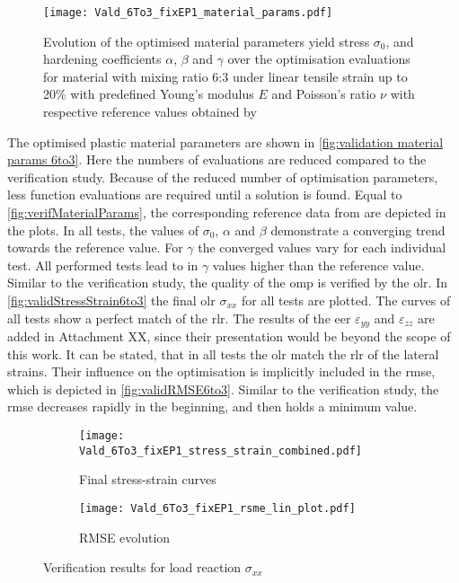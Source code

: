 \begin{figure}[H]
    \centering
    \texttt{[image: Vald\_6To3\_fixEP1\_material\_params.pdf]}
    \caption{Evolution of the optimised material parameters yield stress $\sigma_0$, and hardening coefficients $\alpha$, $\beta$ and $\gamma$ over the optimisation evaluations for material with mixing ratio 6:3 under linear tensile strain up to 20\% with predefined Young's modulus $E$ and Poisson's ratio $\nu$ with respective reference values obtained by \citet{ries_deciphering_nodate}}
    \label{fig:validation material params 6to3}
\end{figure}

The optimised plastic material parameters are shown in \autoref{fig:validation material params 6to3}. Here the numbers of evaluations are reduced compared to the verification study. Because of the reduced number of optimisation parameters, less function evaluations are required until a solution is found.
Equal to \autoref{fig:verifMaterialParams}, the corresponding reference data from \citet{ries_deciphering_nodate} are depicted in the plots.
In all tests, the values of $\sigma_0$, $\alpha$ and $\beta$ demonstrate a converging trend towards the reference value.
For $\gamma$ the converged values vary for each individual test.
All performed tests lead to in $\gamma$ values higher than the reference value. Similar to the verification study, the quality of the \acrlong{omp} is verified by the \acrlong{olr}. In \autoref{fig:validStressStrain6to3} the final \acrlong{olr} $\sigma_{xx}$ for all tests are plotted. The curves of all tests show a perfect match of the \acrlong{rlr}. The results of the \acrlong{eer} $\varepsilon_{yy}$ and $\varepsilon_{zz}$ are added in Attachment XX, since their presentation would be beyond the scope of this work. It can be stated, that in all tests the \acrlong{olr} match the \acrlong{rlr} of the lateral strains. Their influence on the optimisation is implicitly included in the \acrshort{rmse}, which is depicted in \autoref{fig:validRMSE6to3}. Similar to the verification study, the \acrshort{rmse} decreases rapidly in the beginning, and then holds a minimum value.


\begin{figure}[H]
\centering
\begin{subfigure}[t]{0.495\textwidth}
    \centering
    \texttt{[image: Vald\_6To3\_fixEP1\_stress\_strain\_combined.pdf]}
    \caption{ Final stress-strain curves}
    \label{fig:validStressStrain6to3}
\end{subfigure}
\hfill
\begin{subfigure}[t]{0.495\textwidth}
    \centering
    \centering
    \texttt{[image: Vald\_6To3\_fixEP1\_rsme\_lin\_plot.pdf]}
    \caption{RMSE evolution}
    \label{fig:validRMSE6to3}
\end{subfigure}
\caption{Verification results for load reaction $\sigma_{xx}$}
\label{fig:validRes6to3}
\end{figure}




